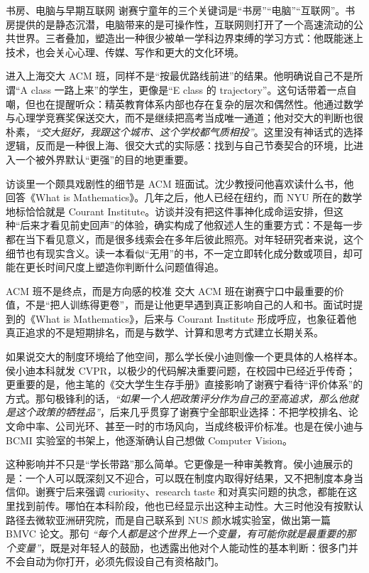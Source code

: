 \documentclass[a4paper,12pt]{article}
\begin{document}
\begin{knowledgebox}{书房、电脑与早期互联网}
谢赛宁童年的三个关键词是“书房”“电脑”“互联网”。书房提供的是静态沉潜，电脑带来的是可操作性，互联网则打开了一个高速流动的公共世界。三者叠加，塑造出一种很少被单一学科边界束缚的学习方式：他既能迷上技术，也会关心心理、传媒、写作和更大的文化环境。
\end{knowledgebox}

进入上海交大 ACM 班，同样不是“按最优路线前进”的结果。他明确说自己不是所谓“A class 一路上来”的学生，更像是“E class 的 trajectory”。这句话带着一点自嘲，但也在提醒听众：精英教育体系内部也存在复杂的层次和偶然性。他通过数学与心理学竞赛奖保送交大，而不是继续把高考当成唯一通道；他对交大的判断也很朴素，\textit{``交大挺好，我跟这个城市、这个学校都气质相投''}。这里没有神话式的选择逻辑，反而是一种很上海、很交大式的实际感：找到与自己节奏契合的环境，比进入一个被外界默认“更强”的目的地更重要。

访谈里一个颇具戏剧性的细节是 ACM 班面试。沈少教授问他喜欢读什么书，他回答《What is Mathematics》。几年之后，他人已经在纽约，而 NYU 所在的数学地标恰恰就是 Courant Institute。访谈并没有把这件事神化成命运安排，但这种“后来才看见前史回声”的体验，确实构成了他叙述人生的重要方式：不是每一步都在当下看见意义，而是很多线索会在多年后彼此照亮。对年轻研究者来说，这个细节也有现实含义。读一本看似“无用”的书，不一定立即转化成分数或项目，却可能在更长时间尺度上塑造你判断什么问题值得追。

\begin{importantbox}{ACM 班不是终点，而是方向感的校准}
交大 ACM 班在谢赛宁口中最重要的价值，不是“把人训练得更卷”，而是让他更早遇到真正影响自己的人和书。面试时提到的《What is Mathematics》，后来与 Courant Institute 形成呼应，也象征着他真正追求的不是短期排名，而是与数学、计算和思考方式建立长期关系。
\end{importantbox}

如果说交大的制度环境给了他空间，那么学长侯小迪则像一个更具体的人格样本。侯小迪本科就发 CVPR，以极少的代码解决重要问题，在校园中已经近乎传奇；更重要的是，他主笔的《交大学生生存手册》直接影响了谢赛宁看待“评价体系”的方式。那句极锋利的话，\textit{``如果一个人把政策评分作为自己的至高追求，那么他就是这个政策的牺牲品''}，后来几乎贯穿了谢赛宁全部职业选择：不把学校排名、论文命中率、公司光环、甚至一时的市场风向，当成终极评价标准。也是在侯小迪与 BCMI 实验室的书架上，他逐渐确认自己想做 Computer Vision。

这种影响并不只是“学长带路”那么简单。它更像是一种审美教育。侯小迪展示的是：一个人可以既深刻又不迎合，可以既在制度内取得好结果，又不把制度本身当信仰。谢赛宁后来强调 curiosity、research taste 和对真实问题的执念，都能在这里找到前传。哪怕在本科阶段，他也已经显示出这种主动性。大三时他没有按默认路径去微软亚洲研究院，而是自己联系到 NUS 颜水城实验室，做出第一篇 BMVC 论文。那句 \textit{``每个人都是这个世界上一个变量，有可能你就是最重要的那个变量''}，既是对年轻人的鼓励，也透露出他对个人能动性的基本判断：很多门并不会自动为你打开，必须先假设自己有资格敲门。
\end{document}
